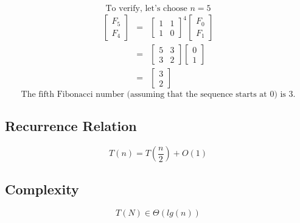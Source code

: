 $$\text{To verify, let's choose } n = 5$$
\begin{eqnarray*}
	\begin{bmatrix}
		F_{5}\\
		F_{4}
	\end{bmatrix}
	&=&
	\begin{bmatrix}
		1 & 1\\
		1 & 0
	\end{bmatrix}^4
	\begin{bmatrix}
		F_{0}\\
		F_{1}
	\end{bmatrix}\\
		&=&
		\begin{bmatrix}
			5 & 3\\
			3 & 2
		\end{bmatrix}
		\begin{bmatrix}
			0\\
			1
		\end{bmatrix}\\
	&=&
	\begin{bmatrix}
		3\\
		2
	\end{bmatrix}
\end{eqnarray*}
$$
\text{The fifth Fibonacci number (assuming that the sequence starts at 0) is 3.}
$$

\subsection*{Recurrence Relation}
$$T(n) = T(\frac{n}{2}) + O(1)$$

\subsection*{Complexity}
$$T(N) \in \Theta(lg(n))$$